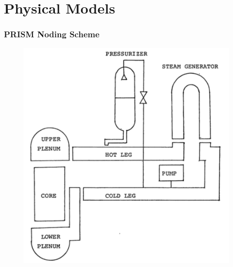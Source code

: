 \documentclass[fleqn]{beamer}
\begin{document}
    \section{Physical Models}
    \begin{frame}
        \frametitle{PRISM Noding Scheme}
        \centering
        \begin{figure}
            \includegraphics[totalheight=0.8\textheight]{prism_thesis.pdf}
        \end{figure}
    \end{frame}
\end{document}
